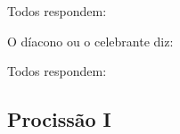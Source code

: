 {  \vspace{-20pt}


  \begin{rubrica}
    \begin{center}
      Todos respondem:
    \end{center}
  \end{rubrica}

  \vspace{-20pt}

}{%
  \begin{paracol}{2}
  \end{paracol}


  \begin{rubrica}
    \begin{center}
      O díacono ou o celebrante diz:
    \end{center}
  \end{rubrica}

  \vspace{-20pt}

  \begin{paracol}{2}
  \end{paracol}

  \begin{rubrica}
    \begin{center}
      Todos respondem:
    \end{center}
  \end{rubrica}

  \vspace{-20pt}

  \begin{paracol}{2}
  \end{paracol}
}

\AllowPageFlush

\subsection{Procissão I}\label{subsection:proprium-sanctorum/in-praesentatione-domini/ad-processionem-1}

